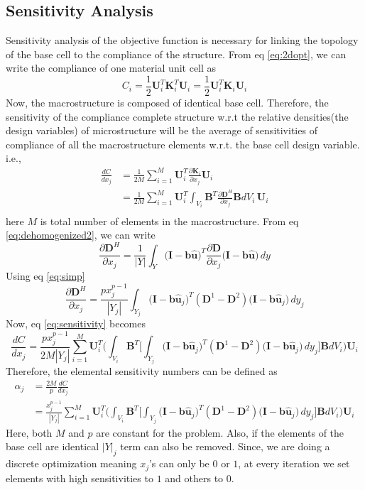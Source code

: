 \documentclass[10pt]{article}
\newcommand{\e}[1]{\textbf{#1}}
\newcommand{\fj}[2]{\frac{\partial #1}{\partial #2}}
\begin{document}
\subsection{Sensitivity Analysis}
Sensitivity analysis of the objective function is necessary for linking the topology of the base cell to the compliance of the structure. From eq \eqref{eq:2dopt}, we can write the compliance of one material unit cell as 
\begin{equation}
C_i = \frac{1}{2}\e U_i^T\e K_i^T\e U_i = \frac{1}{2}\e U_i^T\e K_i\e U_i
\end{equation}
Now, the macrostructure is composed of identical base cell. Therefore, the sensitivity of the compliance complete structure w.r.t the relative densities(the design variables) of microstructure will be the average of sensitivities of compliance of all the macrostructure elements w.r.t. the base cell design variable. i.e.,
\begin{equation}
\label{eq:sensitivity}
\begin{split}
\frac{dC}{dx_j} &= \frac{1}{2M}\sum_{i=1}^M\e U_i^T\fj{\e K_i}{x_j}\e U_i\\
&= \frac{1}{2M}\sum_{i=1}^M\e U_i^T\int_{V_i} \textbf{B}^T\fj{\e D^H}{x_j}\textbf{B} dV_i\,\e U_i\\
\end{split}
\end{equation}
here $M$ is total number of elements in the macrostructure. From eq \eqref{eq:dehomogenized2}, we can write
\begin{equation}
\fj{\e D^H}{x_j} = \frac{1}{|Y|}\int_Y\big (\e I-\textbf{b}\hat{\e u}\big)^T\fj{\e D}{x_j}\big (\e I-\textbf{b}\hat{\e u}\big)\,dy
\end{equation}
Using eq \eqref{eq:simp}
\begin{equation}
\fj{\e D^H}{x_j} = \frac{px^{p-1}_j}{|Y_j|}\int_{Y_j}\big (\e I-\e b\hat{\e u}_j\big)^T(\e D^1 - \e D^2)\big (\e I-\textbf{b}\hat{\e u}_j\big)\,dy_j
\end{equation}
Now, eq \eqref{eq:sensitivity} becomes
\begin{equation}
\label{eq:sensitivity1}
\frac{dC}{dx_j} = \frac{px^{p-1}_j}{2M|Y_j|}\sum_{i=1}^M\e U_i^T\bigg (\int_{V_i} \textbf{B}^T\bigg[\int_{Y_j}\big (\e I-\e b\hat{\e u}_j\big)^T(\e D^1 - \e D^2)\big (\e I-\textbf{b}\hat{\e u}_j\big)\,dy_j\bigg]\textbf{B} dV_i\bigg )\e U_i
\end{equation}
Therefore, the elemental sensitivity numbers can be defined as
\begin{equation}
\label{eq:senanal}
\begin{split}
\alpha_j &= \frac{2M}{p}\frac{dC}{dx_j}\\
&=\frac{x^{p-1}_j}{|Y_j|}\sum_{i=1}^M\e U_i^T\bigg (\int_{V_i} \textbf{B}^T\bigg[\int_{Y_j}\big (\e I-\e b\hat{\e u}_j\big)^T(\e D^1 - \e D^2)\big (\e I-\textbf{b}\hat{\e u}_j\big)\,dy_j\bigg]\textbf{B} dV_i\bigg )\e U_i
\end{split}
\end{equation}
Here, both $M$ and $p$ are constant for the problem. Also, if the elements of the base cell are identical $|Y|_j$ term can also be removed. Since, we are doing a discrete optimization meaning $x_j$'s can only be $0$ or $1$, at every iteration we set elements with high sensitivities to $1$ and others to $0$.
\end{document}
